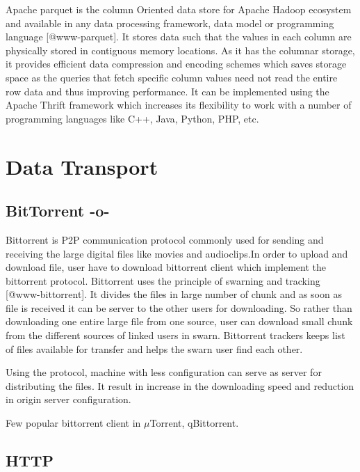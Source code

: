 Apache parquet is the column Oriented data store for Apache Hadoop
ecosystem and available in any data processing framework, data model
or programming language [@www-parquet]. It stores data such that
the values in each column are physically stored in contiguous memory
locations. As it has the columnar storage, it provides efficient data
compression and encoding schemes which saves storage space as the
queries that fetch specific column values need not read the entire row
data and thus improving performance. It can be implemented using the
Apache Thrift framework which increases its flexibility to work with a
number of programming languages like C++, Java, Python, PHP, etc.
     
\section{Data Transport}

\subsection{BitTorrent -o-}

Bittorrent is P2P communication protocol commonly used for sending and
receiving the large digital files like movies and audioclips.In order
to upload and download file, user have to download bittorrent client
which implement the bittorrent protocol. Bittorrent uses the principle
of swarning and tracking [@www-bittorrent]. It divides the files
in large number of chunk and as soon as file is received it can be
server to the other users for downloading.  So rather than downloading
one entire large file from one source, user can download small chunk
from the different sources of linked users in swarn. Bittorrent
trackers keeps list of files available for transfer and helps the
swarn user find each other.

Using the protocol, machine with less configuration can serve as
server for distributing the files. It result in increase in the
downloading speed and reduction in origin server configuration.

Few popular bittorrent client in $\mu$Torrent, qBittorrent.



\subsection{HTTP}
